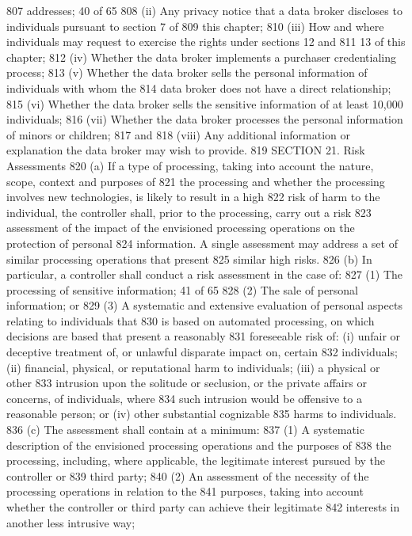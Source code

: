 807 addresses;
40 of 65
808 (ii) Any privacy notice that a data broker discloses to individuals pursuant to section 7 of
809 this chapter;
810 (iii) How and where individuals may request to exercise the rights under sections 12 and
811 13 of this chapter;
812 (iv) Whether the data broker implements a purchaser credentialing process;
813 (v) Whether the data broker sells the personal information of individuals with whom the
814 data broker does not have a direct relationship;
815 (vi) Whether the data broker sells the sensitive information of at least 10,000 individuals;
816 (vii) Whether the data broker processes the personal information of minors or children;
817 and
818 (viii) Any additional information or explanation the data broker may wish to provide.
819 SECTION 21. Risk Assessments
820 (a) If a type of processing, taking into account the nature, scope, context and purposes of
821 the processing and whether the processing involves new technologies, is likely to result in a high
822 risk of harm to the individual, the controller shall, prior to the processing, carry out a risk
823 assessment of the impact of the envisioned processing operations on the protection of personal
824 information. A single assessment may address a set of similar processing operations that present
825 similar high risks.
826 (b) In particular, a controller shall conduct a risk assessment in the case of:
827 (1) The processing of sensitive information; 
41 of 65
828 (2) The sale of personal information; or
829 (3) A systematic and extensive evaluation of personal aspects relating to individuals that
830 is based on automated processing, on which decisions are based that present a reasonably
831 foreseeable risk of: (i) unfair or deceptive treatment of, or unlawful disparate impact on, certain
832 individuals; (ii) financial, physical, or reputational harm to individuals; (iii) a physical or other
833 intrusion upon the solitude or seclusion, or the private affairs or concerns, of individuals, where
834 such intrusion would be offensive to a reasonable person; or (iv) other substantial cognizable
835 harms to individuals.
836 (c) The assessment shall contain at a minimum:
837 (1) A systematic description of the envisioned processing operations and the purposes of
838 the processing, including, where applicable, the legitimate interest pursued by the controller or
839 third party;
840 (2) An assessment of the necessity of the processing operations in relation to the
841 purposes, taking into account whether the controller or third party can achieve their legitimate
842 interests in another less intrusive way;
